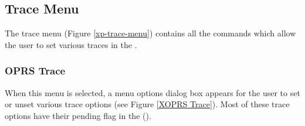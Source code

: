 \subsection{Trace Menu}


The trace menu (Figure \ref{xp-trace-menu}) contains all the commands which
allow the user to set various traces in the \XPK{}.



\subsubsection{OPRS Trace}


When this menu is selected, a menu options dialog box appears for the user
to set or unset various trace options (see Figure \ref{XOPRS Trace}). Most of
these trace options have their pending flag in the \CPK{} ().

